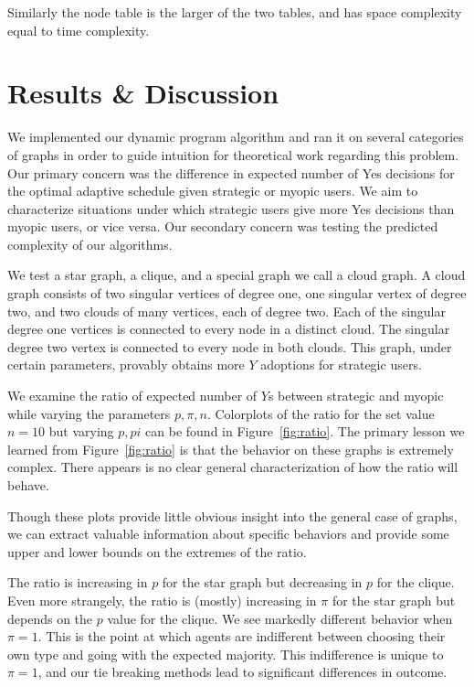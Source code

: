 \documentclass{article}
\begin{document}
Similarly the node table is the larger of the two tables, and has space
complexity equal to time complexity.

\section{Results \& Discussion}
We implemented our dynamic program algorithm and ran it on several categories of graphs in order to guide intuition for theoretical work regarding this problem. Our primary concern was the difference in expected number of Yes decisions for the optimal adaptive schedule given strategic or myopic users. We aim to characterize situations under which strategic users give more Yes decisions than myopic users, or vice versa. Our secondary concern was testing the predicted complexity of our algorithms.

We test a star graph, a clique, and a special graph we call a cloud graph. A cloud graph consists of two singular vertices of degree one, one singular vertex of degree two, and two clouds of many vertices, each of degree two. Each of the singular degree one vertices is connected to every node in a distinct cloud. The singular degree two vertex is connected to every node in both clouds. This graph, under certain parameters, provably obtains more $Y$ adoptions for strategic users.

We examine the ratio of expected number of $Y$s between strategic and myopic while varying the parameters $p, \pi, n$. Colorplots of the ratio for the set value $n=10$ but varying $p, pi$ can be found in Figure~\ref{fig:ratio}. The primary lesson we learned from Figure~\ref{fig:ratio} is that the behavior on these graphs is extremely complex. There appears is no clear general characterization of how the ratio will behave.

Though these plots provide little obvious insight into the general case of graphs, we can extract valuable information about specific behaviors and provide some upper and lower bounds on the extremes of the ratio.

The ratio is increasing in $p$ for the star graph but decreasing in $p$ for the clique. Even more strangely, the ratio is (mostly) increasing in $\pi$ for the star graph but depends on the $p$ value for the clique. We see markedly different behavior when $\pi = 1$. This is the point at which agents are indifferent between choosing their own type and going with the expected majority. This indifference is unique to $\pi=1$, and our tie breaking methods lead to significant differences in outcome.
\end{document}
